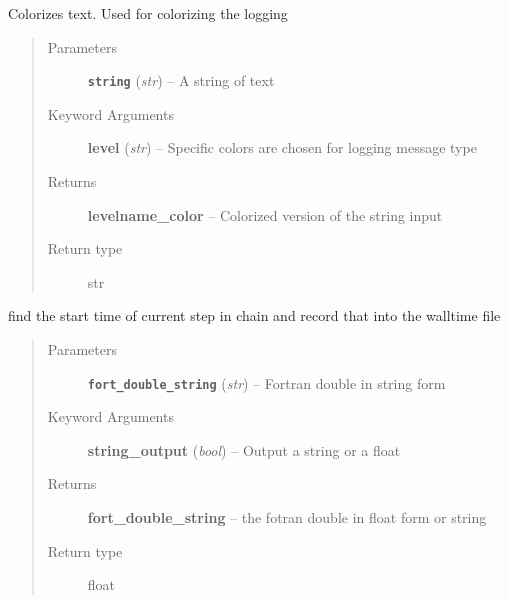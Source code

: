\documentclass[letterpaper,10pt,english]{sphinxmanual}
\begin{document}

\begin{fulllineitems}
\label{run:run.__colorize_message}
Colorizes text. Used for colorizing the logging
\begin{quote}\begin{description}
\item[{Parameters}] \leavevmode
\textbf{\texttt{string}} (\emph{str}) -- A string of text

\item[{Keyword Arguments}] \leavevmode
\textbf{level} (\emph{str}) --
Specific colors are chosen for logging message type

\item[{Returns}] \leavevmode
\textbf{levelname\_color} --
Colorized version of the string input

\item[{Return type}] \leavevmode
str

\end{description}\end{quote}

\end{fulllineitems}


\begin{fulllineitems}
\label{run:run.__convert_fortran_double}
find the start time of current step in chain and record that into the walltime file
\begin{quote}\begin{description}
\item[{Parameters}] \leavevmode
\textbf{\texttt{fort\_double\_string}} (\emph{str}) -- Fortran double in string form

\item[{Keyword Arguments}] \leavevmode
\textbf{string\_output} (\emph{bool}) --
Output a string or a float

\item[{Returns}] \leavevmode
\textbf{fort\_double\_string} --
the fotran double in float form or string

\item[{Return type}] \leavevmode
float

\end{description}\end{quote}

\end{fulllineitems}
\end{document}
